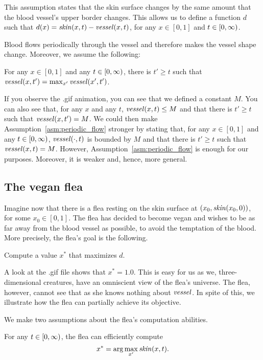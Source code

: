 This assumption states that the skin surface changes by the same amount that the blood vessel's upper border changes. This allows us to define a function $d$ such that $d(x) = \mathit{skin}(x, t) - \mathit{vessel}(x, t)$, for any $x \in [0, 1]$ and $t \in [0, \infty)$.

Blood flows periodically through the vessel and therefore makes the vessel shape change. Moreover, we assume the following:

\begin{assumption}
For any $x \in [0,1]$ and any $t \in [0, \infty)$, there is $t' \geq t$ such that $\mathit{vessel}(x, t') = \max_{x'}\mathit{vessel}(x', t')$.
\label{asm:periodic_flow}
\end{assumption}

If you observe the .gif animation, you can see that we defined a constant $M$. You can also see that, for any $x$ and any $t$, $\mathit{vessel}(x, t) \leq M$ and that there is $t' \geq t$ such that $\mathit{vessel}(x, t') = M$. We could then make Assumption~\ref{asm:periodic_flow} stronger by stating that, for any $x \in [0, 1]$ and any $t \in [0, \infty)$, $\mathit{vessel}(\cdot, t)$ is bounded by $M$ and that there is $t' \geq t$ such that $\mathit{vessel}(x, t) = M$. However, Assumption~\ref{asm:periodic_flow} is enough for our purposes. Moreover, it is weaker and, hence, more general.

\subsection{The vegan flea}

Imagine now that there is a flea resting on the skin surface at $(x_0, \mathit{skin}(x_0, 0))$, for some $x_0 \in [0, 1]$. The flea has decided to become vegan and wishes to be as far away from the blood vessel as possible, to avoid the temptation of the blood. More precisely, the flea's goal is the following.

\begin{objective}
Compute a value $x^*$ that maximizes $d$.
\end{objective}

A look at the .gif file shows that $x^* = 1.0$. This is easy for us as we, three-dimensional creatures, have an omniscient view of the flea's universe. The flea, however, cannot see that as she knows nothing about $\mathit{vessel}$. In spite of this, we illustrate how the flea can partially achieve its objective.

We make two assumptions about the flea's computation abilities.

\begin{assumption}
For any $t \in [0, \infty)$, the flea can efficiently compute 
%
$$x^* = \arg\max_{x'}\mathit{skin}(x, t).$$
%
\label{asm:flea_m_step}
\end{assumption}

